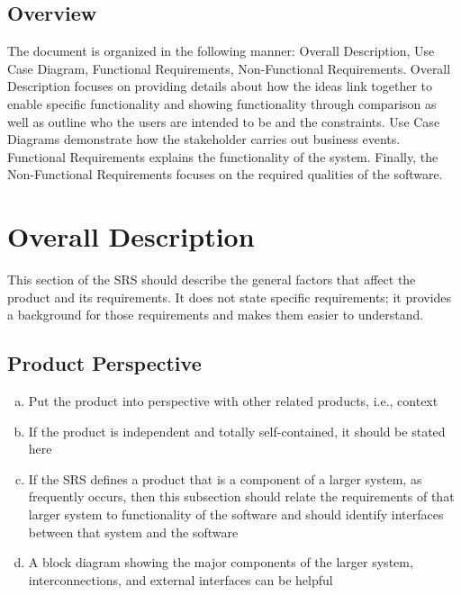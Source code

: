 \documentclass[]{article}
\begin{document}
\subsection{Overview}
\label{sub:overview}
The document is organized in the following manner: Overall Description, Use 
Case Diagram, Functional Requirements, Non-Functional Requirements. Overall 
Description focuses on providing details about how the ideas link together to 
enable specific functionality and showing functionality through comparison as 
well as outline who the users are intended to be and the constraints. Use Case 
Diagrams demonstrate how the stakeholder carries out business events. Functional 
Requirements explains the functionality of the system. Finally, the 
Non-Functional Requirements focuses on the required qualities of the software.


\section{Overall Description}
\label{sec:overall_description}

This section of the SRS should describe the general factors that affect the product and its requirements. It does not state specific requirements; it provides a background for those requirements and makes them easier to understand.

\subsection{Product Perspective}
\label{sub:product_perspective}
\begin{enumerate}[a)]
	\item Put the product into perspective with other related products, i.e., context
	\item If the product is independent and totally self-contained, it should be stated here
	\item If the SRS defines a product that is a component of a larger system, as frequently occurs, then this subsection should relate the requirements of that larger system to functionality of the software and should identify interfaces between that system and the software
	\item A block diagram showing the major components of the larger system, interconnections, and external interfaces can be helpful
\end{enumerate}
\end{document}
